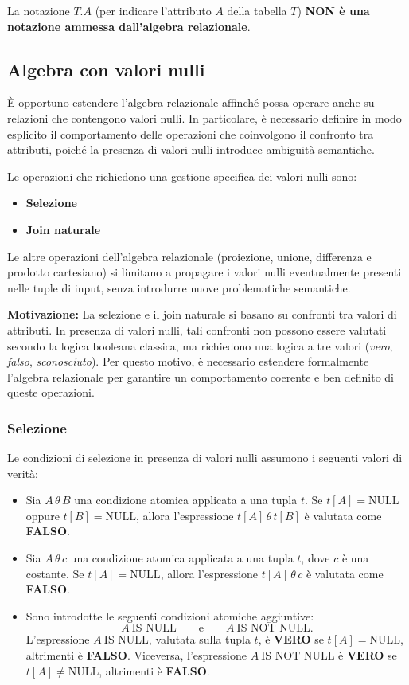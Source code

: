 \noindent
La notazione \( T.A \) (per indicare l’attributo \( A \) della tabella \( T \))
\textbf{NON è una notazione ammessa dall’algebra relazionale}.
\subsection{Algebra con valori nulli}
È opportuno estendere l’algebra relazionale affinché possa operare anche su relazioni che contengono valori nulli.
In particolare, è necessario definire in modo esplicito il comportamento delle operazioni che coinvolgono il
confronto tra attributi, poiché la presenza di valori nulli introduce ambiguità semantiche.

Le operazioni che richiedono una gestione specifica dei valori nulli sono:
\begin{itemize}
	\item \textbf{Selezione}
	\item \textbf{Join naturale}
\end{itemize}

Le altre operazioni dell’algebra relazionale (proiezione, unione, differenza e prodotto cartesiano) 
si limitano a propagare i valori nulli eventualmente presenti nelle tuple di input, senza introdurre
nuove problematiche semantiche.

\medskip

\noindent
\textbf{Motivazione:}
La selezione e il join naturale si basano su confronti tra valori di attributi.
In presenza di valori nulli, tali confronti non possono essere valutati secondo la logica booleana classica,
ma richiedono una logica a tre valori (\textit{vero}, \textit{falso}, \textit{sconosciuto}).
Per questo motivo, è necessario estendere formalmente l’algebra relazionale per garantire
un comportamento coerente e ben definito di queste operazioni.
\subsubsection{Selezione}

Le condizioni di selezione in presenza di valori nulli assumono i seguenti valori di verità:

\begin{itemize}
	\item Sia $A \,\theta\, B$ una condizione atomica applicata a una tupla $t$.
	Se $t[A] = \text{NULL}$ oppure $t[B] = \text{NULL}$, allora l’espressione
	$t[A] \,\theta\, t[B]$ è valutata come \textbf{FALSO}.
	
	\item Sia $A \,\theta\, c$ una condizione atomica applicata a una tupla $t$, dove $c$ è una costante.
	Se $t[A] = \text{NULL}$, allora l’espressione
	$t[A] \,\theta\, c$ è valutata come \textbf{FALSO}.
	
	\item Sono introdotte le seguenti condizioni atomiche aggiuntive:
	\[
	A \ \text{IS NULL} \qquad \text{e} \qquad A \ \text{IS NOT NULL}.
	\]
	L’espressione $A \ \text{IS NULL}$, valutata sulla tupla $t$, è \textbf{VERO} se $t[A] = \text{NULL}$,
	altrimenti è \textbf{FALSO}.  
	Viceversa, l’espressione $A \ \text{IS NOT NULL}$ è \textbf{VERO} se $t[A] \neq \text{NULL}$,
	altrimenti è \textbf{FALSO}.
\end{itemize}

